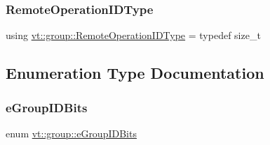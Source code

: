 \mbox{\label{namespacevt_1_1group_a73f2624ddeb535b39a08b6524f26b244}} 
\subsubsection{\texorpdfstring{Remote\+Operation\+I\+D\+Type}{RemoteOperationIDType}}
{\footnotesize\ttfamily using \hyperlink{namespacevt_1_1group_a73f2624ddeb535b39a08b6524f26b244}{vt\+::group\+::\+Remote\+Operation\+I\+D\+Type} = typedef size\+\_\+t}



\subsection{Enumeration Type Documentation}
\mbox{\label{namespacevt_1_1group_a5a472f320821bf638e6df82757b71163}} 
\subsubsection{\texorpdfstring{e\+Group\+I\+D\+Bits}{eGroupIDBits}}
{\footnotesize\ttfamily enum \hyperlink{namespacevt_1_1group_a5a472f320821bf638e6df82757b71163}{vt\+::group\+::e\+Group\+I\+D\+Bits}}

